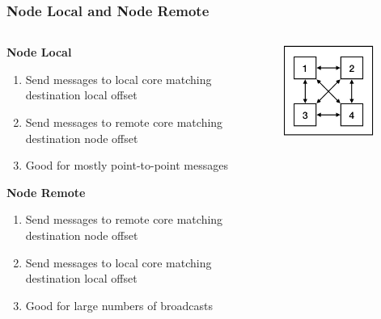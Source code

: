 \documentclass{beamer}
\begin{document}
\begin{frame}
\frametitle{Node Local and Node Remote}


\begin{columns}
\begin{column}{0.65\textwidth}
	\textbf{Node Local}
	\begin{enumerate}
		\item Send messages to local core matching destination local offset
		\item Send messages to remote core matching destination node offset
		\item Good for mostly point-to-point messages
	\end{enumerate}
	\textbf{Node Remote}
	\begin{enumerate}
		\item Send messages to remote core matching destination node offset
		\item Send messages to local core matching destination local offset
		\item Good for large numbers of broadcasts
	\end{enumerate}
\end{column}
\begin{column}{0.35\textwidth}  %
\begin{center}
	\includegraphics[width=0.7\textwidth]{local}
\end{center}
\begin{center}

\end{center}
\end{column}
\end{columns}
\end{frame}
\end{document}
